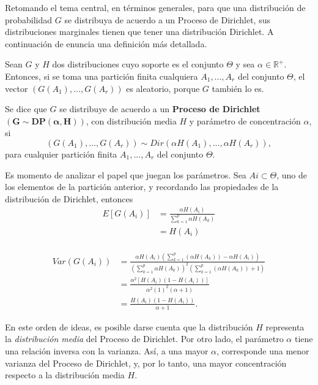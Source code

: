 Retomando el tema central, en t\'erminos generales, para que una distribuci\'on de probabilidad $G$ se distribuya de acuerdo a un Proceso de Dirichlet, sus distribuciones marginales tienen que tener una distribuci\'on Dirichlet. A continuaci\'on de enuncia una definici\'on m\'as detallada.

\begin{defin}
    Sean $G$ y $H$ dos distribuciones cuyo soporte es el conjunto $\Theta$ y sea $\alpha \in \mathbb{R}^+$. Entonces, si se toma una partici\'on finita cualquiera $A_1,...,A_r$ del conjunto $\Theta$, el vector $(G(A_1),...,G(A_r))$ es aleatorio, porque $G$ tambi\'en lo es.
    
    Se dice que $G$ se distribuye de acuerdo a un \textbf{Proceso de Dirichlet} $\mathbf{(G \sim DP(\alpha,H))}$, con distribuci\'on media $H$ y par\'ametro de concentraci\'on $\alpha$, si
    \begin{equation*}
        (G(A_1),...,G(A_r)) \sim Dir(\alpha H(A_1),...,\alpha H(A_r)), 
    \end{equation*}
    para cualquier partici\'on finita $A_1,...,A_r$ del conjunto $\Theta$.
\end{defin}

Es momento de analizar el papel que juegan los par\'ametros. Sea $Ai \subset \Theta$, uno de los elementos de la partici\'on anterior, y recordando las propiedades de la distribuci\'on de Dirichlet, entonces
\begin{equation*}
\begin{aligned}
    E[G(A_i)] 
    &= \frac{\alpha H(A_i)}{\sum_{k=1}^p \alpha H(A_k)} \\
    &= H(A_i) \\
\end{aligned}
\end{equation*}

\begin{equation*}
\begin{aligned}
    Var(G(A_i)) 
    &= \frac{\alpha H(A_i)\left(\sum_{k=1}^p(\alpha H(A_k)) - \alpha H(A_i)\right)}
       {\left(\sum_{k=1}^p \alpha H(A_k)\right)^2\left(\sum_{k=1}^p(\alpha H(A_k)) + 1\right)} \\
    &= \frac{\alpha^2 [H(A_i)(1 - H(A_i))]}
       {\alpha^2 (1)^2(\alpha + 1)} \\
    &= \frac{H(A_i)(1 - H(A_i))}
       {\alpha + 1}.
\end{aligned}
\end{equation*}

En este orden de ideas, es posible darse cuenta que la distribuci\'on $H$ representa la \textit{distribuci\'on media} del Proceso de Dirichlet. Por otro lado, el par\'ametro $\alpha$ tiene una relaci\'on inversa con la varianza. As\'i, a una mayor $\alpha$, corresponde una menor varianza del Proceso de Dirichlet, y, por lo tanto, una mayor concentraci\'on respecto a la distribuci\'on media $H$. 

